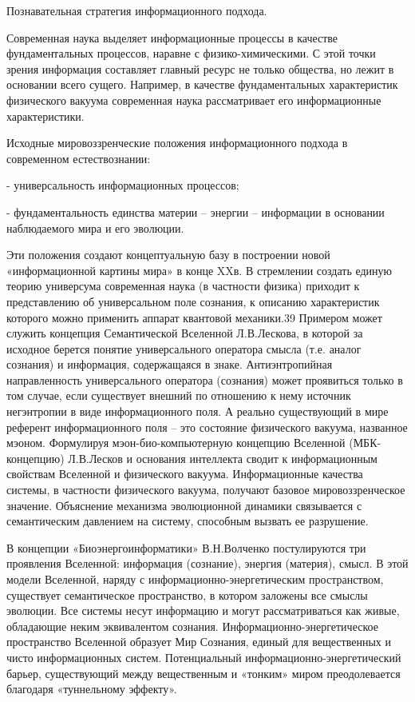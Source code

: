 \documentclass[exam_answers.tex]{subfiles}
\begin{document}
Познавательная стратегия информационного подхода.

Современная наука выделяет информационные процессы в качестве
фундаментальных процессов, наравне с физико-химическими. С этой точки зрения
информация составляет главный ресурс не только общества, но лежит в основании
всего сущего. Например, в качестве фундаментальных характеристик физического
вакуума современная наука рассматривает его информационные характеристики.

Исходные мировоззренческие положения информационного подхода в
современном естествознании:

- универсальность информационных процессов;

- фундаментальность единства материи – энергии – информации в
основании наблюдаемого мира и его эволюции.

Эти положения создают концептуальную базу в построении новой
«информационной картины мира» в конце XXв. В стремлении создать единую
теорию универсума современная наука (в частности физика) приходит к
представлению об универсальном поле сознания, к описанию характеристик
которого можно применить аппарат квантовой механики.39 Примером может
служить концепция Семантической Вселенной Л.В.Лескова, в которой за
исходное берется понятие универсального оператора смысла (т.е. аналог
сознания) и информация, содержащаяся в знаке. Антиэнтропийная
направленность универсального оператора (сознания) может проявиться только
в том случае, если существует внешний по отношению к нему источник
негэнтропии в виде информационного поля. А реально существующий в мире
референт информационного поля – это состояние физического вакуума,
названное мэоном. Формулируя мэон-био-компьютерную концепцию Вселенной
(МБК-концепцию) Л.В.Лесков и основания интеллекта сводит к
информационным свойствам Вселенной и физического вакуума.
Информационные качества системы, в частности физического вакуума,
получают базовое мировоззренческое значение. Объяснение механизма
эволюционной динамики связывается с семантическим давлением на систему,
способным вызвать ее разрушение.

В концепции «Биоэнергоинформатики» В.Н.Волченко постулируются три
проявления Вселенной: информация (сознание), энергия (материя), смысл. В
этой модели Вселенной, наряду с информационно-энергетическим
пространством, существует семантическое пространство, в котором заложены
все смыслы эволюции. Все системы несут информацию и могут
рассматриваться как живые, обладающие неким эквивалентом сознания.
Информационно-энергетическое пространство Вселенной образует Мир
Сознания, единый для вещественных и чисто информационных систем.
Потенциальный информационно-энергетический барьер, существующий между
вещественным и «тонким» миром преодолевается благодаря «туннельному
эффекту».
\end{document}
